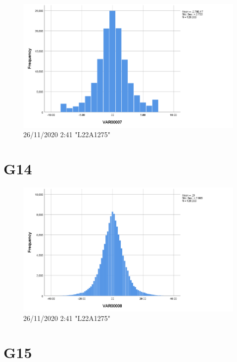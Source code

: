 \documentclass[hidelinks, 12pt, a4paper]{article}
\begin{document}
\begin{figure}[h!]
	\centering
		\includegraphics[height=.38\textheight, width=\textwidth]{assets/session1/g13.png}
		\caption{26/11/2020 2:41 "L22A1275"}
	\end{figure}

\section{G14}
\begin{figure}[h!]
	\centering
		\includegraphics[height=.38\textheight, width=\textwidth]{assets/session1/g14.png}
		\caption{26/11/2020 2:41 "L22A1275"}
	\end{figure}

\section{G15}
\end{document}
